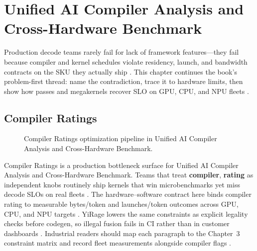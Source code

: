\chapter{Unified AI Compiler Analysis and Cross-Hardware Benchmark}
\label{chap:ch21}

Production decode teams rarely fail for lack of framework features---they fail because compiler and kernel schedules violate residency, launch, and bandwidth contracts on the SKU they actually ship \citep{patel2025llminference,nvidia2022hopper}. This chapter continues the book's problem-first thread: name the contradiction, trace it to hardware limits, then show how passes and megakernels recover SLO on GPU, CPU, and NPU fleets \citep{taxbreak2026,semianalysis2024tma}.

\section{Compiler Ratings}
\label{sec:compiler_ratings}
\begin{figure}[t]
\centering
{}
\caption{Compiler Ratings optimization pipeline in Unified AI Compiler Analysis and Cross-Hardware Benchmark.}
\label{fig:compiler_ratings_pipeline}
\end{figure}


Compiler Ratings is a production bottleneck surface for Unified AI Compiler Analysis and Cross-Hardware Benchmark. Teams that treat \textbf{compiler}, \textbf{rating} as independent knobs routinely ship kernels that win microbenchmarks yet miss decode SLOs on real fleets \citep{patel2025llminference,nvidia2022hopper}. The hardware--software contract here binds compiler rating to measurable bytes/token and launches/token outcomes across GPU, CPU, and NPU targets \citep{taxbreak2026,semianalysis2024tma}. YiRage lowers the same constraints as explicit legality checks before codegen, so illegal fusion fails in CI rather than in customer dashboards \citep{memoryfloor2026,amd2024xdna}. Industrial readers should map each paragraph to the Chapter~3 constraint matrix and record fleet measurements alongside compiler flags \citep{nvidia2022hopper,amd2024aie}.

